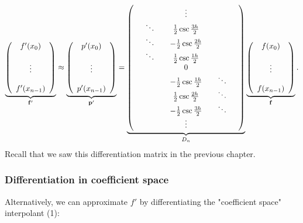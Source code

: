 \documentclass[12pt,a4paper]{article}
\begin{document}
\[
\underbrace{\left(
\begin{array}{c}
f'(x_0) \\
  \\
\vdots  \\
  \\
f'(x_{n-1})
\end{array}
\right)}_{\mathbf{f}'} \approx 
\underbrace{\left(
\begin{array}{c}
p'(x_0) \\
  \\
\vdots  \\
  \\
p'(x_{n-1})
\end{array}
\right)}_{\mathbf{p}'} = 
\underbrace{\left(
\begin{array}{c c c c c c c}
  &       &       & \vdots  &   &   & \\
  &\ddots &       & \frac{1}{2}\csc \frac{3h}{2}   &   &    &  \\
   &\ddots &      &-\frac{1}{2}\csc \frac{2h}{2}   &   &    &  \\ 
   &\ddots &      & \frac{1}{2}\csc \frac{1h}{2}   &   &    &   \\
  &        &      & 0                              &   &    &   \\
&      &      & -\frac{1}{2}\csc \frac{1h}{2}   &   &   \ddots &  \\
&      &      & \frac{1}{2}\csc \frac{2h}{2}   &   &   \ddots &  \\
&      &      & -\frac{1}{2}\csc \frac{3h}{2}   &   &   \ddots &  \\
&      &      & \vdots  &   &    &  \\
\end{array}
\right)}_{D_n}
\underbrace{\left(
\begin{array}{c}
f(x_0) \\
  \\
\vdots  \\
  \\
f(x_{n-1})
\end{array}
\right)}_{\mathbf{f}}.
\]
Recall that we saw this differentiation matrix in the previous chapter.

\subsubsection{Differentiation in coefficient space}
Alternatively, we can approximate $f'$ by differentiating the "coefficient space" interpolant (1):
\end{document}
